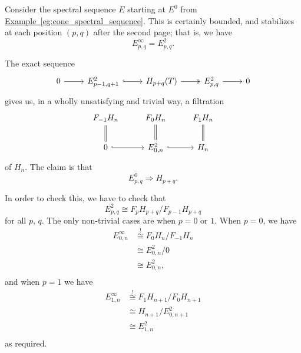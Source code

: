 \documentclass[main.tex]{subfiles}
\begin{document}
\begin{example}
  Consider the spectral sequence $E$ starting at $E^{0}$ from \hyperref[eg:cone_spectral_sequence]{Example~\ref*{eg:cone_spectral_sequence}}. This is certainly bounded, and stabilizes at each position $(p, q)$ after the second page; that is, we have
  \begin{equation*}
    E^{\infty}_{p,q} = E^{2}_{p,q}.
  \end{equation*}

  The exact sequence
  \begin{equation*}
    \begin{tikzcd}
      0
      \arrow[r]
      & E^{2}_{p-1,q+1}
      \arrow[r, hook]
      & H_{p+q}(T)
      \arrow[r, two heads]
      & E^{2}_{p,q}
      \arrow[r]
      & 0
    \end{tikzcd}
  \end{equation*}
  gives us, in a wholly unsatisfying and trivial way, a filtration
  \begin{equation*}
    \begin{tikzcd}
      F_{-1}H_{n}
      \arrow[d, equals]
      & F_{0}H_{n}
      \arrow[d, equals]
      & F_{1}H_{n}
      \arrow[d, equals]
      \\
      0
      \arrow[r, hook]
      & E^{2}_{0, n}
      \arrow[r, hook]
      & H_{n}
    \end{tikzcd}
  \end{equation*}
  of $H_{n}$. The claim is that
  \begin{equation*}
    E^{0}_{p,q} \Rightarrow H_{p+q}.
  \end{equation*}

  In order to check this, we have to check that
  \begin{equation*}
    E^{2}_{p,q} \cong F_{p}H_{p+q}/F_{p-1}H_{p+q}
  \end{equation*}
  for all $p$, $q$. The only non-trivial cases are when $p = 0$ or $1$. When $p = 0$, we have
  \begin{align*}
    E^{\infty}_{0, n} &\overset{!}{\cong} F_{0}H_{n}/F_{-1}H_{n} \\
    &\cong E^{2}_{0,n}/ 0 \\
    &\cong E^{2}_{0,n}, \\
  \end{align*}
  and when $p = 1$ we have
  \begin{align*}
    E^{\infty}_{1, n} &\overset{!}{\cong} F_{1}H_{n+1}/F_{0}H_{n+1} \\
    &\cong H_{n+1}/ E^{2}_{0,n+1} \\
    &\cong E^{2}_{1,n} \\
  \end{align*}
  as required.
\end{example}
\end{document}

